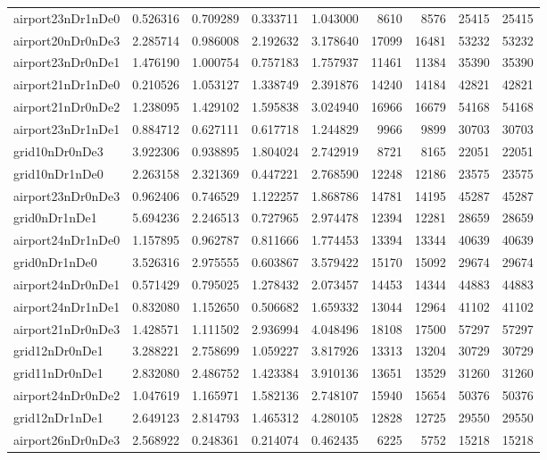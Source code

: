 \begin{longtable}{|l|r|r|r|r|r|r|r|r|}
airport23nDr1nDe0 & 0.526316 & 0.709289 & 0.333711 & 1.043000 & 8610 & 8576 & 25415 & 25415 \\
airport20nDr0nDe3 & 2.285714 & 0.986008 & 2.192632 & 3.178640 & 17099 & 16481 & 53232 & 53232 \\
airport23nDr0nDe1 & 1.476190 & 1.000754 & 0.757183 & 1.757937 & 11461 & 11384 & 35390 & 35390 \\
airport21nDr1nDe0 & 0.210526 & 1.053127 & 1.338749 & 2.391876 & 14240 & 14184 & 42821 & 42821 \\
airport21nDr0nDe2 & 1.238095 & 1.429102 & 1.595838 & 3.024940 & 16966 & 16679 & 54168 & 54168 \\
airport23nDr1nDe1 & 0.884712 & 0.627111 & 0.617718 & 1.244829 & 9966 & 9899 & 30703 & 30703 \\
grid10nDr0nDe3 & 3.922306 & 0.938895 & 1.804024 & 2.742919 & 8721 & 8165 & 22051 & 22051 \\
grid10nDr1nDe0 & 2.263158 & 2.321369 & 0.447221 & 2.768590 & 12248 & 12186 & 23575 & 23575 \\
airport23nDr0nDe3 & 0.962406 & 0.746529 & 1.122257 & 1.868786 & 14781 & 14195 & 45287 & 45287 \\
grid0nDr1nDe1 & 5.694236 & 2.246513 & 0.727965 & 2.974478 & 12394 & 12281 & 28659 & 28659 \\
airport24nDr1nDe0 & 1.157895 & 0.962787 & 0.811666 & 1.774453 & 13394 & 13344 & 40639 & 40639 \\
grid0nDr1nDe0 & 3.526316 & 2.975555 & 0.603867 & 3.579422 & 15170 & 15092 & 29674 & 29674 \\
airport24nDr0nDe1 & 0.571429 & 0.795025 & 1.278432 & 2.073457 & 14453 & 14344 & 44883 & 44883 \\
airport24nDr1nDe1 & 0.832080 & 1.152650 & 0.506682 & 1.659332 & 13044 & 12964 & 41102 & 41102 \\
airport21nDr0nDe3 & 1.428571 & 1.111502 & 2.936994 & 4.048496 & 18108 & 17500 & 57297 & 57297 \\
grid12nDr0nDe1 & 3.288221 & 2.758699 & 1.059227 & 3.817926 & 13313 & 13204 & 30729 & 30729 \\
grid11nDr0nDe1 & 2.832080 & 2.486752 & 1.423384 & 3.910136 & 13651 & 13529 & 31260 & 31260 \\
airport24nDr0nDe2 & 1.047619 & 1.165971 & 1.582136 & 2.748107 & 15940 & 15654 & 50376 & 50376 \\
grid12nDr1nDe1 & 2.649123 & 2.814793 & 1.465312 & 4.280105 & 12828 & 12725 & 29550 & 29550 \\
airport26nDr0nDe3 & 2.568922 & 0.248361 & 0.214074 & 0.462435 & 6225 & 5752 & 15218 & 15218 \\

\end{longtable}
